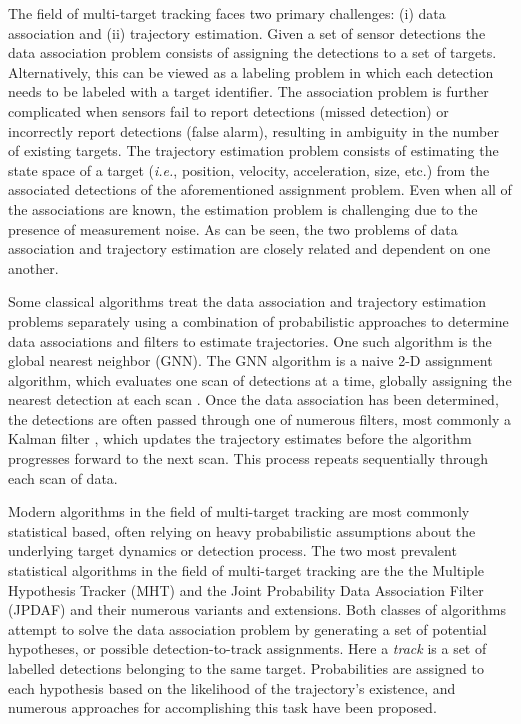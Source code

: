 \documentclass[journal]{IEEEtran}
\begin{document}
The field of multi-target tracking faces two primary challenges: (i) data association and (ii) trajectory estimation.  Given a set of sensor detections the data association problem consists of assigning the detections to a set of targets. Alternatively, this can be viewed as a labeling problem in which each detection needs to be labeled with a target identifier. The association problem is further complicated when sensors fail to report detections (missed detection) or incorrectly report detections (false alarm), resulting in ambiguity in the number of existing targets. The trajectory estimation problem consists of estimating the state space of a target (\textit{i.e.}, position, velocity, acceleration, size, etc.) from the associated detections of the aforementioned assignment problem. Even when all of the associations are known, the estimation problem is challenging due to the presence of measurement noise. As can be seen, the two problems of data association and trajectory estimation are closely related and dependent on one another. 

Some classical algorithms treat the data association and trajectory estimation problems separately using a combination of probabilistic approaches to determine data associations and filters to estimate trajectories. One such algorithm is the global nearest neighbor (GNN). The GNN algorithm is a naive 2-D assignment algorithm, which evaluates one scan of detections at a time, globally assigning the nearest detection at each scan \cite{GNN}. Once the data association has been determined, the detections are often passed through one of numerous filters, most commonly a Kalman filter \cite{Kalman}, which updates the trajectory estimates before the algorithm progresses forward to the next scan. This process repeats sequentially through each scan of data.

Modern algorithms in the field of multi-target tracking are most commonly statistical based, often relying on heavy probabilistic assumptions about the underlying target dynamics or detection process. The two most prevalent statistical algorithms in the field of multi-target tracking are the the Multiple Hypothesis Tracker (MHT) and the Joint Probability Data Association Filter (JPDAF) and their numerous variants and extensions. Both classes of algorithms attempt to solve the data association problem by generating a set of potential hypotheses, or possible detection-to-track assignments. Here a \textit{track} is a set of labelled detections belonging to the same target. Probabilities are assigned to each hypothesis based on the likelihood of the trajectory's existence, and numerous approaches for accomplishing this task have been proposed.
\end{document}
